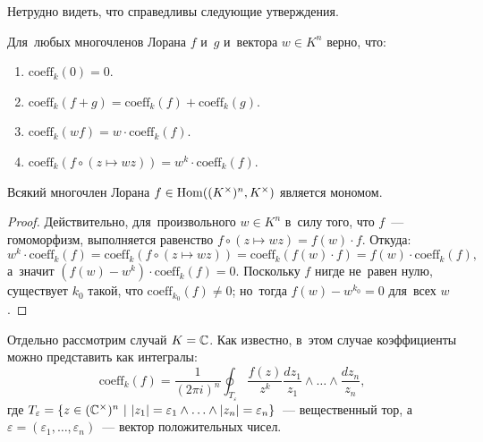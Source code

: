 \documentclass[a4paper,oneside]{article}
\begin{document}
Нетрудно видеть, что справедливы следующие утверждения.
\begin{lemma*}
  Для~любых многочленов Лорана $f$ и~$g$ и~вектора $w \in K^n$ верно, что:
  \begin{enumerate}
    \item $\mathrm{coeff}_k(0) = 0$.
    \item $\mathrm{coeff}_k(f + g) = \mathrm{coeff}_k(f) + \mathrm{coeff}_k(g)$.
    \item $\mathrm{coeff}_k(w f) = w \cdot \mathrm{coeff}_k(f)$.
    \item $\mathrm{coeff}_k(f \circ (z \mapsto wz)) = w^k \cdot \mathrm{coeff}_k(f)$.
  \end{enumerate}
\end{lemma*}

\begin{theorem*}
  Всякий многочлен Лорана $f \in \mathrm{Hom}((K^\times)^n, K^\times)$ является мономом.
\end{theorem*}

\begin{proof}
  Действительно, для~произвольного $w \in K^n$ в~силу того, что $f$~— гомоморфизм,
  выполняется равенство $f \circ (z \mapsto wz) = f(w) \cdot f$. Откуда:
  \[
    w^k \cdot \mathrm{coeff}_k(f) = \mathrm{coeff}_k(f \circ (z \mapsto wz)) = \mathrm{coeff}_k(f(w) \cdot f) = f(w) \cdot \mathrm{coeff}_k(f),
  \]
  а~значит $(f(w) - w^k) \cdot \mathrm{coeff}_k(f) = 0$.
  Поскольку $f$ нигде не~равен нулю, существует $k_0$ такой, что $\mathrm{coeff}_{k_0}(f) \neq 0$;
  но~тогда $f(w) - w^{k_0} = 0$ для~всех $w$.
\end{proof}

Отдельно рассмотрим случай $K = \mathbb{C}$. Как известно, в~этом случае коэффициенты можно представить как интегралы:
\[
  \mathrm{coeff}_k(f) = \frac{1}{(2 \pi i)^n} \oint_{T_\varepsilon} \frac{f(z)}{z^k} \frac{dz_1}{z_1} \wedge \ldots \wedge \frac{dz_n}{z_n},
\]
где $T_\varepsilon = \{ z \in (\torus)^n\ |\ |z_1| = \varepsilon_1 \wedge \ldots \wedge |z_n| = \varepsilon_n \}$~— вещественный тор,
а~$\varepsilon = (\varepsilon_1, \ldots, \varepsilon_n)$~— вектор положительных чисел.
\end{document}
